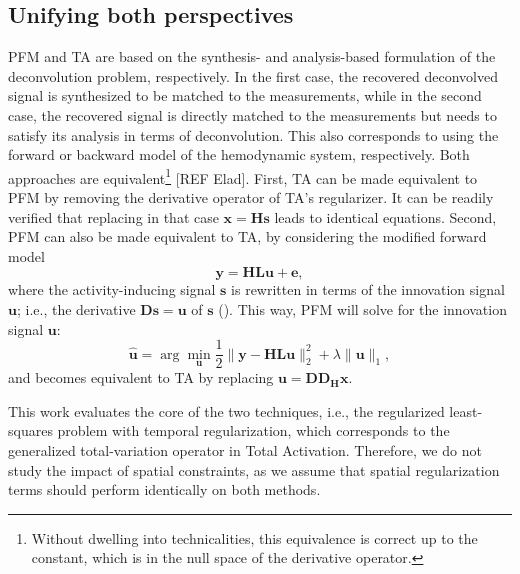 \subsection{Unifying both perspectives}

PFM and TA are based on the synthesis- and analysis-based formulation of the deconvolution problem, respectively. In the first case, the recovered deconvolved signal is synthesized to be matched to the measurements, while in the second case, the recovered signal is directly matched to the measurements but needs to satisfy its analysis in terms of deconvolution. This also corresponds to using the forward or backward model of the hemodynamic system, respectively. Both approaches are equivalent\footnote{Without dwelling into technicalities, this equivalence is correct up to the constant, which is in the null space of the derivative operator.} [REF Elad]. First, TA can be made equivalent to PFM by removing the derivative operator of TA's regularizer. It can be readily verified that replacing in that case $\mathbf{x}=\mathbf{Hs}$ leads to identical equations. Second, PFM can also be made equivalent to TA, by considering the modified forward model
$$
\mathbf{y} = \mathbf{H L u} + \mathbf{e},
$$
where the activity-inducing signal $\mathbf{s}$ is rewritten in terms of the innovation signal $\mathbf{u}$; i.e., the derivative $\mathbf{Ds}=\mathbf{u}$ of $\mathbf{s}$ (\citealt{cherkaoui2019SparsitybasedBlindDeconvolution,urunuela2020StabilityBasedSparseParadigm}). This way, PFM will solve for the innovation signal $\mathbf{u}$: 
\begin{equation}
    \label{eq:pfm_block}
    \hat{\mathbf{u}} = \arg \min_{\mathbf{u}} \frac{1}{2} \| \mathbf{y} - \mathbf{HLu} \|_2^2 + \lambda \| \mathbf{u} \|_1,
\end{equation}
and becomes equivalent to TA by replacing $\mathbf{u}=\mathbf{D D_H x}$. 

This work evaluates the core of the two techniques, i.e., the regularized least-squares problem with temporal regularization, which corresponds to the generalized total-variation operator in Total Activation. Therefore, we do not study the impact of spatial constraints, as we assume that spatial regularization terms should perform identically on both methods.

